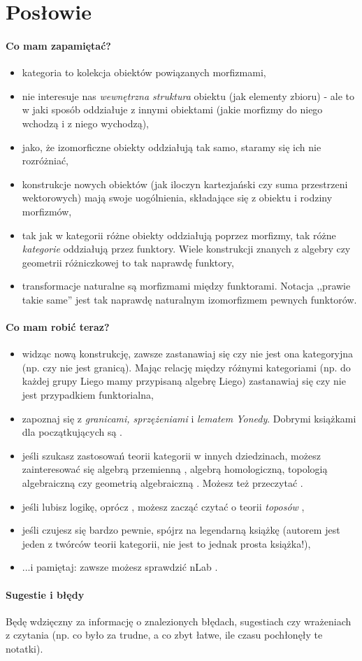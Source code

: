 \section{Posłowie}
\paragraph{Co mam zapamiętać?}
\begin{itemize}
  \item kategoria to kolekcja obiektów powiązanych morfizmami,
  \item nie interesuje nas \emph{wewnętrzna struktura} obiektu (jak elementy zbioru) - ale to w jaki sposób oddziałuje z innymi obiektami (jakie morfizmy do niego wchodzą i z niego wychodzą),
  \item jako, że izomorficzne obiekty oddziałują tak samo, staramy się ich nie rozróżniać,
  \item konstrukcje nowych obiektów (jak iloczyn kartezjański czy suma przestrzeni wektorowych) mają swoje uogólnienia, składające się z obiektu i rodziny morfizmów,
  \item tak jak w kategorii różne obiekty oddziałują poprzez morfizmy, tak różne \emph{kategorie} oddziałują przez funktory. Wiele konstrukcji znanych z algebry czy geometrii różniczkowej to tak naprawdę funktory,
  \item transformacje naturalne są morfizmami między funktorami. Notacja ,,prawie takie same'' jest tak naprawdę naturalnym izomorfizmem pewnych funktorów.
\end{itemize}

\paragraph{Co mam robić teraz?}
\begin{itemize}
  \item widząc nową konstrukcję, zawsze zastanawiaj się czy nie jest ona kategoryjna (np. czy nie jest granicą). Mając relację między różnymi kategoriami (np. do każdej grupy Liego mamy przypisaną algebrę Liego) zastanawiaj się czy nie jest przypadkiem funktorialna,
  \item zapoznaj się z \emph{granicami, sprzężeniami} i \emph{lematem Yonedy}. Dobrymi książkami dla początkujących są \cite{Awodey, Baez, Leinster}.
  \item jeśli szukasz zastosowań teorii kategorii w innych dziedzinach, możesz zainteresować się algebrą przemienną \cite{AtiyahMacdonald}, algebrą homologiczną, topologią algebraiczną \cite{May} czy geometrią algebraiczną \cite{Vakil}. Możesz też przeczytać \cite{Rosetta}.
  \item jeśli lubisz logikę, oprócz \cite{Rosetta, Awodey}, możesz zacząć czytać o teorii \emph{toposów} \cite{Barr, MacLane_Moerdijk},
  \item jeśli czujesz się bardzo pewnie, spójrz na legendarną książkę \cite{MacLane} (autorem jest jeden z twórców teorii kategorii, nie jest to jednak prosta książka!),
  \item ...i pamiętaj: zawsze możesz sprawdzić nLab \cite{nLab}.
\end{itemize}

\paragraph{Sugestie i błędy} Będę wdzięczny za informację o znalezionych błędach, sugestiach czy wrażeniach z czytania (np. co było za trudne, a co zbyt łatwe, ile czasu pochłonęły te notatki).
